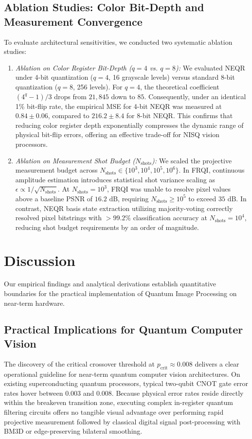 \documentclass[12pt,onecolumn,draftclsnofoot]{IEEEtran}
\begin{document}
\subsection{Ablation Studies: Color Bit-Depth and Measurement Convergence}
To evaluate architectural sensitivities, we conducted two systematic ablation studies:
\begin{enumerate}
    \item \textit{Ablation on Color Register Bit-Depth ($q=4$ vs. $q=8$):} We evaluated NEQR under 4-bit quantization ($q=4$, 16 grayscale levels) versus standard 8-bit quantization ($q=8$, 256 levels). For $q=4$, the theoretical coefficient $(4^q - 1)/3$ drops from $21,845$ down to $85$. Consequently, under an identical 1\% bit-flip rate, the empirical MSE for 4-bit NEQR was measured at $0.84 \pm 0.06$, compared to $216.2 \pm 8.4$ for 8-bit NEQR. This confirms that reducing color register depth exponentially compresses the dynamic range of physical bit-flip errors, offering an effective trade-off for NISQ vision processors.
    \item \textit{Ablation on Measurement Shot Budget ($N_{\text{shots}}$):} We scaled the projective measurement budget across $N_{\text{shots}} \in \{10^3, 10^4, 10^5, 10^6\}$. In FRQI, continuous amplitude estimation introduces statistical shot variance scaling as $\epsilon \propto 1/\sqrt{N_{\text{shots}}}$. At $N_{\text{shots}} = 10^3$, FRQI was unable to resolve pixel values above a baseline PSNR of $16.2\text{ dB}$, requiring $N_{\text{shots}} \ge 10^5$ to exceed $35\text{ dB}$. In contrast, NEQR basis state extraction utilizing majority-voting correctly resolved pixel bitstrings with $>99.2\%$ classification accuracy at $N_{\text{shots}} = 10^4$, reducing shot budget requirements by an order of magnitude.
\end{enumerate}

\FloatBarrier
\section{Discussion}
Our empirical findings and analytical derivations establish quantitative boundaries for the practical implementation of Quantum Image Processing on near-term hardware.

\subsection{Practical Implications for Quantum Computer Vision}
The discovery of the critical crossover threshold at $p_{\text{crit}} \approx 0.008$ delivers a clear operational guideline for near-term quantum computer vision architectures. On existing superconducting quantum processors, typical two-qubit CNOT gate error rates hover between $0.003$ and $0.008$. Because physical error rates reside directly within the breakeven transition zone, executing complex in-register quantum filtering circuits offers no tangible visual advantage over performing rapid projective measurement followed by classical digital signal post-processing with BM3D or edge-preserving bilateral smoothing. 
\end{document}

